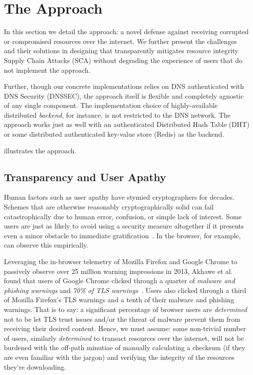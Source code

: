 \section{The \SYSTEM{} Approach} \label{sec:approach}

In this section we detail the \SYSTEM{} approach: a novel defense against
receiving corrupted or compromised resources over the internet. We further
present the challenges and their solutions in designing \SYSTEM{} that
transparently mitigates resource integrity Supply Chain Attacks (SCA) without
degrading the experience of users that do not implement the \SYSTEM{} approach.

Further, though our concrete implementations relies on DNS authenticated with
DNS Security (DNSSEC), the approach itself is flexible and completely agnostic
of any single component. The implementation choice of highly-available
distributed \emph{backend}, for instance, is not restricted to the DNS network.
The approach works just as well with an authenticated Distributed Hash Table
(DHT) or some distributed authenticated key-value store (\eg Redis) as the
backend.

 
illustrates the \SYSTEM{} approach.

\subsection{Transparency and User Apathy}

Human factors such as user apathy have stymied cryptographers for decades.
Schemes that are otherwise reasonably cryptographically solid can fail
catastrophically due to human error, confusion, or simple lack of interest. Some
users are just as likely to avoid using a security measure altogether if it
presents even a minor obstacle to immediate gratification~\cite{Clickthrough,
PGPBad}. In the browser, for example, can observe this empirically.

Leveraging the in-browser telemetry of Mozilla Firefox and Google Chrome to
passively observe over 25 million warning impressions in 2013, Akhawe et al.
found that users of Google Chrome clicked through a quarter of \emph{malware and
phishing warnings} and \emph{70\% of TLS warnings}~\cite{Clickthrough}. Users
also clicked through a third of Mozilla Firefox's TLS warnings and a tenth of
their malware and phishing warnings. That is to say: a significant percentage of
browser users are \emph{determined} not to be let TLS trust issues and/or the
threat of malware prevent them from receiving their desired content. Hence, we
must assume: some non-trivial number of users, similarly \emph{determined} to
transact resources over the internet, will not be burdened with the off-path
minutiae of manually calculating a checksum (if they are even familiar with the
jargon) and verifying the integrity of the resources they're downloading.

